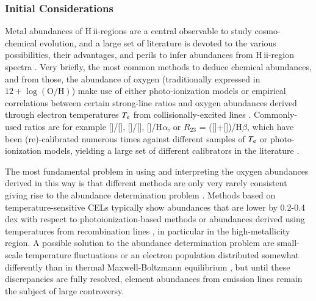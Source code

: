 \documentclass[traditabstract, referee]{aa}
\newcommand{\hb}{H$\beta$}
\newcommand{\ha}{H$\alpha$}
\newcommand{\hii}{\mbox{H\,{\sc ii}}}
\newcommand{\oh}{12+\log(\mathrm{O/H})}
\newcommand{\oii}{[\ion{O}{ii}]}
\newcommand{\oiii}{[\ion{O}{iii}]}
\newcommand{\nii}{[\ion{N}{ii}]}
\begin{document}
\subsubsection{Initial Considerations}

Metal abundances of \hii-regions are a central observable to study cosmo-chemical evolution, and a large set of literature is devoted to the various possibilities, their advantages, and perils to infer abundances from \hii-region spectra \citep[e.g.][]{1979MNRAS.189...95P, 1991ApJ...380..140M, 2005ApJ...631..231P, 2008ApJ...681.1183K}. Very briefly, the most common methods to deduce chemical abundances, and from those, the abundance of oxygen (traditionally expressed in $\oh$) make use of either photo-ionization models \citep[e.g.][]{1985ApJS...58..125E, 2000ApJ...542..224D, 2002ApJS..142...35K} or empirical correlations between certain strong-line ratios and oxygen abundances derived through electron temperatures $T_{\rm{e}}$ from collisionally-excited lines \citep[CELs, e.g.][]{2004MNRAS.348L..59P, 2013A&A...559A.114M}. Commonly-used ratios are for example \nii/\oii, \oiii/\nii, \nii/\ha, or $R_{23}$ = (\oii+\oiii)/\hb, which have been (re)-calibrated numerous times against different samples of $T_{\rm{e}}$ or photo-ionization models, yielding a large set of different calibrators in the literature \citep[e.g.][]{2002ApJS..142...35K, 2004ApJ...617..240K, 2005ApJ...631..231P, 2006A&A...459...85N, 2008A&A...488..463M}.

The most fundamental problem in using and interpreting the oxygen abundances derived in this way is that different methods are only very rarely consistent \citep[e.g.][]{2008ApJ...681.1183K} giving rise to the abundance determination problem \citep{1967ApJ...150..825P}. Methods based on temperature-sensitive CELs typically show abundances that are lower by 0.2-0.4 dex with respect to photoionization-based methods or abundances derived using temperatures from recombination lines \citep[e.g.][and references therein]{2012MNRAS.426.2630L}, in particular in the high-metallicity region. A possible solution to the abundance determination problem are small-scale temperature fluctuations \citep[e.g.][]{2003ApJ...584..735P, 2004MNRAS.355..229E} or an electron population distributed somewhat differently than in thermal Maxwell-Boltzmann equilibrium \citep{2012ApJ...752..148N, 2012MNRAS.426.2630L}, but until these discrepancies are fully resolved, element abundances from emission lines remain the subject of large controversy.
\end{document}
